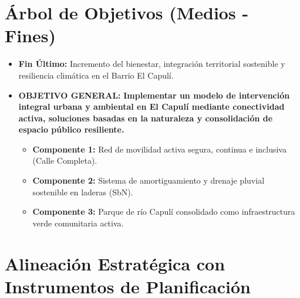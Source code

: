 \documentclass[
  letterpaper,
  DIV=11,
  numbers=noendperiod]{scrreprt}
\providecommand{\tightlist}{%
  \setlength{\itemsep}{0pt}\setlength{\parskip}{0pt}}
\begin{document}
\section{Árbol de Objetivos (Medios -
Fines)}\label{uxe1rbol-de-objetivos-medios---fines}

\begin{itemize}
\tightlist
\item
  \textbf{Fin Último:} Incremento del bienestar, integración territorial
  sostenible y resiliencia climática en el Barrio El Capulí.
\item
  \textbf{OBJETIVO GENERAL:} \textbf{Implementar un modelo de
  intervención integral urbana y ambiental en El Capulí mediante
  conectividad activa, soluciones basadas en la naturaleza y
  consolidación de espacio público resiliente.}

  \begin{itemize}
  \tightlist
  \item
    \textbf{Componente 1:} Red de movilidad activa segura, continua e
    inclusiva (Calle Completa).
  \item
    \textbf{Componente 2:} Sistema de amortiguamiento y drenaje pluvial
    sostenible en laderas (SbN).
  \item
    \textbf{Componente 3:} Parque de río Capulí consolidado como
    infraestructura verde comunitaria activa.
  \end{itemize}
\end{itemize}

\section{Alineación Estratégica con Instrumentos de
Planificación}\label{alineaciuxf3n-estratuxe9gica-con-instrumentos-de-planificaciuxf3n}
\end{document}
